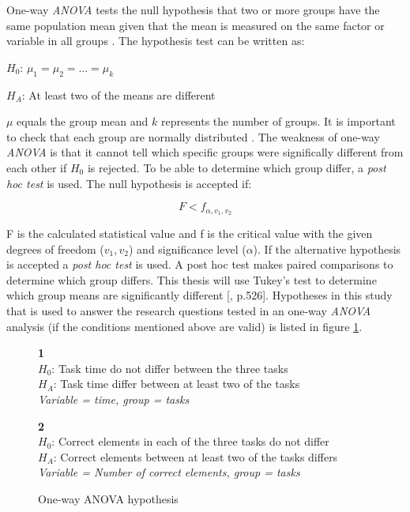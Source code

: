 One-way \textit{ANOVA} tests the null hypothesis that two or more groups have the same population mean given that the mean is measured on the same factor or variable in all groups \citep{LundResearchLtd2013a}. The hypothesis test can be written as:\newline

\centerline{$H_{0}$:  $\mu_{1} =  \mu_{2} = ... = \mu_{k} $} 
\centerline{$H_{A}$:  At least two of the means are different}

$\mu$ equals the group mean and $k$ represents the number of groups. It is important to check that each group are normally distributed \citep{LundResearchLtd2013a}. The weakness of one-way \textit{ANOVA} is that it cannot tell which specific groups were significally different from each other if $H_{0}$ is rejected. To be able to determine which group differ, a \textit{post hoc test} is used. The null hypothesis is accepted if:

\begin{equation}
\label{eq:anova_reject}
F < f_{\alpha, v_{1}, v_{2}}
\end{equation}

F is the calculated statistical value and f is the critical value with the given degrees of freedom ($v_{1}, v_{2}$) and significance level ($\alpha$). If the alternative hypothesis is accepted a \textit{post hoc test} is used. A post hoc test makes paired comparisons to determine which group differs. This thesis will use Tukey's test to determine which group means are significantly different [\citep{Walpole2012}, p.526]. Hypotheses in this study that is used to answer the research questions tested in an one-way \textit{ANOVA} analysis (if the conditions mentioned above are valid) is listed in figure \ref{fig:hypothesis_anova}. 

\begin{figure}[H]
	\begin{framed}\centering
		\textbf{1}\\
		$H_{0}$: Task time do not differ between the three tasks\\
		$H_{A}$: Task time differ between at least two of the tasks\\
		\textit{Variable = time, group = tasks}\newline
		
		\textbf{2}\\
		$H_{0}$: Correct elements in each of the three tasks do not differ\\
		$H_{A}$: Correct elements between at least two of the tasks differs \\
		\textit{Variable = Number of correct elements, group = tasks}
		
	\end{framed}
	\caption{One-way ANOVA hypothesis}
	\label{fig:hypothesis_anova}
\end{figure}

